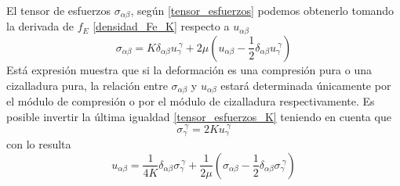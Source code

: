 El tensor de esfuerzos $\sigma_{\alpha\beta}$, según \eqref{tensor_esfuerzos}
podemos obtenerlo tomando la derivada de $f_E$ \eqref{densidad_Fe_K} respecto
a $u_{\alpha\beta}$
\begin{equation}\label{tensor_esfuerzos_K}
\sigma_{\alpha\beta}=K\delta_{\alpha\beta}u_{\gamma}^{\ \gamma}+2\mu\left(u_{\alpha\beta}-\frac{1}{2}\delta_{\alpha\beta}u_{\gamma}^{\ \gamma}\right)
\end{equation}
Está expresión muestra que si la deformación es una compresión pura o una
cizalladura pura, la relación entre $\sigma_{\alpha\beta}$ y $u_{\alpha\beta}$
estará determinada únicamente por el módulo de compresión o por el módulo de
cizalladura respectivamente. Es posible invertir la última igualdad
\eqref{tensor_esfuerzos_K} teniendo en cuenta que
\begin{equation}
\sigma_{\gamma}^{\ \gamma}=2 K u_{\gamma}^{\ \gamma}
\end{equation}
con lo resulta
\begin{equation}\label{hooke}
u_{\alpha\beta}=\frac{1}{4K}\delta_{\alpha\beta}\sigma_{\gamma}^{\
  \gamma}+\frac{1}{2\mu}\left(\sigma_{\alpha\beta}-\frac{1}{2}\delta_{\alpha\beta}\sigma_{\gamma}^{\
    \gamma}\right)
\end{equation}


